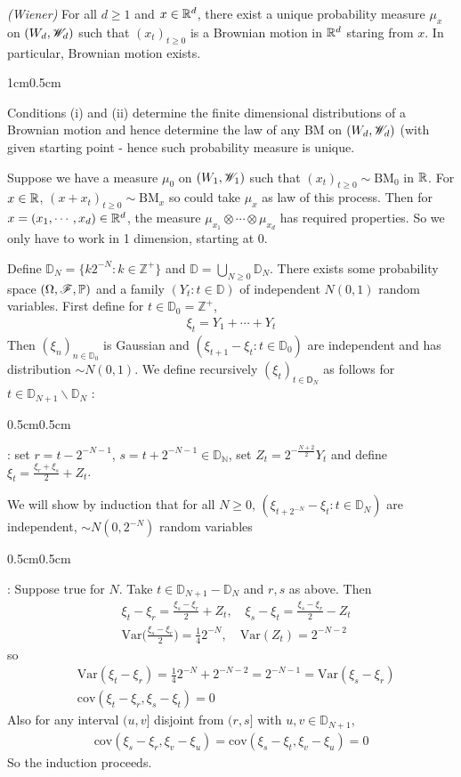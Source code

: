 \documentclass[12pt,a4paper]{report}
\newenvironment{proof}
{\begin{changemargin}{1cm}{0.5cm} 
	}%
	{\end{changemargin}
}
\newenvironment{subproof}
{\begin{changemargin}{0.5cm}{0.5cm} 
	}%
	{\end{changemargin}
}
\begin{document}
\emph{(Wiener)} For all $d\geq 1$ and $x\in \mathbb{R}^d$, there exist a unique probability measure $\mu_x$ on $(W_d, \mathscr{W}_d)$ such that $(x_t)_{t\geq 0}$ is a Brownian motion in $\mathbb{R}^d$ staring from $x$. In particular, Brownian motion exists.
\begin{proof}
\pf Conditions (i) and (ii) determine the finite dimensional distributions of a Brownian motion and hence determine the law of any BM on $(W_d, \mathscr{W}_d)$ (with given starting point - hence such probability measure is unique.

\quad Suppose we have a measure $\mu_0$ on $(W_1, \mathscr{W}_1)$ such that $(x_t)_{t\geq 0} \sim \text{BM}_0$ in $\mathbb{R}$. For $x\in \mathbb{R}$, $(x+x_t)_{t\geq 0} \sim \text{BM}_x$ so could take $\mu_x$ as law of this process. Then for $x=(x_1, \cdots, x_d) \in \mathbb{R}^d$, the measure $\mu_{x_1} \otimes \cdots \otimes \mu_{x_d}$ has required properties. So we only have to work in 1 dimension, starting at 0.

\quad Define $\mathbb{D}_N = \{k2^{-N}: k\in \mathbb{Z}^+ \}$ and $\mathbb{D} = \bigcup_{N\geq 0} \mathbb{D}_N$. There exists some probability space $(\Omega, \mathscr{F}, \mathbb{P})$ and a family $(Y_t : t\in \mathbb{D})$ of independent $N(0,1)$ random variables. First define for $t\in \mathbb{D}_0 = \mathbb{Z}^+$,
\begin{align*}
\xi_t = Y_1 + \cdots + Y_t
\end{align*}
Then $(\xi_n)_{n \in \mathbb{D}_0}$ is Gaussian and $(\xi_{t+1} - \xi_t : t\in \mathbb{D}_0)$ are independent and has distribution $\sim N(0,1)$. We define recursively $(\xi_t)_{t\in \mathsf{D}_N}$ as follows for $t\in \mathbb{D}_{N+1} \backslash \mathbb{D}_N$ :
\begin{subproof}
: set $r = t-2^{-N-1}$, $s=t+2^{-N-1} \in \mathbb{D_N}$, set $Z_t = 2^{- \frac{N+2}{2}} Y_t$ and define $\xi_t = \frac{\xi_r + \xi_s}{2} + Z_t$.
\end{subproof}
We will show by induction that for all $N\geq 0$, $(\xi_{t+2^{-N}} - \xi_t: t\in \mathbb{D}_N)$ are independent, $\sim N(0,2^{-N})$ random variables
\begin{subproof}
: Suppose true for $N$. Take $t\in \mathbb{D}_{N+1} - \mathbb{D}_N$ and $r,s$ as above. Then
\begin{align*}
& \xi_t - \xi_r = \frac{\xi_s - \xi_r}{2} + Z_t, \quad \xi_s - \xi_t = \frac{\xi_s - \xi_r}{2} - Z_t \\
& \text{Var}\Big( \frac{\xi_s-\xi_r}{2}\Big) = \frac{1}{4} 2^{-N}, \quad \text{Var}(Z_t) = 2^{-N-2}
\end{align*}
so
\begin{align*}
& \text{Var}(\xi_t - \xi_r) = \frac{1}{4} 2^{-N} + 2^{-N-2} = 2^{-N-1} = \text{Var} (\xi_s -\xi_r) \\
& \text{cov}(\xi_t -\xi_r, \xi_s - \xi_t) =0
\end{align*}
Also for any interval $(u,v]$ disjoint from $(r,s]$ with $u,v\in \mathbb{D}_{N+1}$,
\begin{align*}
\text{cov}(\xi_s - \xi_r, \xi_v - \xi_u) = \text{cov}(\xi_s - \xi_t, \xi_v- \xi_u) =0
\end{align*}
So the induction proceeds.
\end{subproof}
\end{proof}
\s
\end{document}
